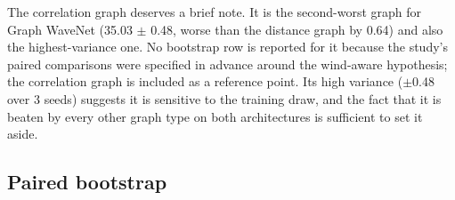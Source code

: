 \documentclass[11pt,a4paper]{article}
\begin{document}
The correlation graph deserves a brief note.  It is the second-worst graph for
Graph WaveNet (35.03 $\pm$ 0.48, worse than the distance graph by 0.64) and
also the highest-variance one.  No bootstrap row is reported for it because the
study's paired comparisons were specified in advance around the wind-aware
hypothesis; the correlation graph is included as a reference point.  Its high
variance ($\pm$0.48 over 3 seeds) suggests it is sensitive to the training draw,
and the fact that it is beaten by every other graph type on both architectures
is sufficient to set it aside.

\subsection{Paired bootstrap}

\begin{table}[htbp]
\centering
\caption{Paired bootstrap over test weeks for the MAE difference (A minus B). Negative means A is better. The interval excludes zero when the difference is reliable.}
\label{tab:boot}
\end{table}
\end{document}
